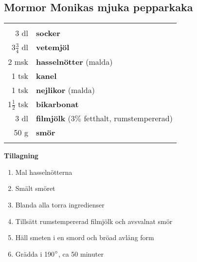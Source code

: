\clearpage

\subsection{Mormor Monikas mjuka pepparkaka}

\begin{table}[H]
	\begin{tabular}{rl}
	\hline
	&\\
		3 dl & \textbf{socker}\\
		3$\frac{3}{4}$ dl & \textbf{vetemjöl}\\
		2 msk & \textbf{hasselnötter} (malda)\\
		1 tsk & \textbf{kanel}\\
		1 tsk & \textbf{nejlikor} (malda)\\
		1$\frac{1}{2}$ tsk & \textbf{bikarbonat}\\
		3 dl & \textbf{filmjölk} (3$\%$ fetthalt, rumstempererad)\\
		50 g & \textbf{smör}\\
	&\\
	\hline
	\end{tabular}
\end{table}

\begin{multicols*}{2}

\noindent \textbf{Tillagning}
\begin{enumerate}
	\itemsep0cm
	\item Mal hasselnötterna
	\item Smält smöret
	\item Blanda alla torra ingredienser
	\item Tillsätt rumstempererad filmjölk och avsvalnat smör
	\item Häll smeten i en smord och \mbox{bröad} avlång form
	\item Grädda i 190$\degree$, ca 50 minuter
\end{enumerate}

\end{multicols*}

\clearpage